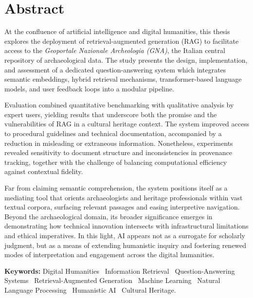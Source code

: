 \chapter{Abstract}
\label{chap:abstract}
\begin{spacing}{1.5}
At the confluence of artificial intelligence and digital humanities, this thesis explores the deployment of retrieval-augmented generation (RAG) to facilitate access to the \textit{Geoportale Nazionale Archeologia (GNA)}, the Italian central repository of archaeological data. The study presents the design, implementation, and assessment of a dedicated question-answering system which integrates semantic embeddings, hybrid retrieval mechanisms, transformer-based language models, and user feedback loops into a modular pipeline.

Evaluation combined quantitative benchmarking with qualitative analysis by expert users, yielding results that underscore both the promise and the vulnerabilities of RAG in a cultural heritage context. The system improved access to procedural guidelines and technical documentation, accompanied by a reduction in misleading or extraneous information. Nonetheless, experiments revealed sensitivity to document structure and inconsistencies in provenance tracking, together with the challenge of balancing computational efficiency against contextual fidelity.

Far from claiming semantic comprehension, the system positions itself as a mediating tool that orients archaeologists and heritage professionals within vast textual corpora, surfacing relevant passages and easing interpretive navigation. Beyond the archaeological domain, its broader significance emerges in demonstrating how technical innovation intersects with infrastructural limitations and ethical imperatives. In this light, AI appears not as a surrogate for scholarly judgment, but as a means of extending humanistic inquiry and fostering renewed modes of interpretation and engagement across the digital humanities.

\vspace{\baselineskip} %
\noindent\textbf{Keywords:} Digital Humanities \textperiodcentered\ Information Retrieval \textperiodcentered\ Question-Answering Systems \textperiodcentered\ Retrieval-Augmented Generation \textperiodcentered\ Machine Learning \textperiodcentered\ Natural Language Processing \textperiodcentered\ Humanistic AI \textperiodcentered\ Cultural Heritage.

\end{spacing}